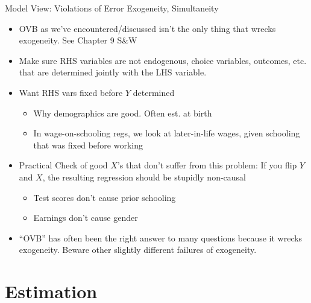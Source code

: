 \documentclass[aspectratio=169, handout]{beamer}
\begin{document}
{\footnotesize
\begin{frame}{Model View: Violations of Error Exogeneity, Simultaneity}
\begin{itemize}
  \item OVB as we've encountered/discussed isn't the \alert{only} thing
    that wrecks exogeneity.  See Chapter 9 S\&W
  \item Make sure RHS variables are not \alert{endogenous},
    \alert{choice variables}, \alert{outcomes}, etc.
    that are determined jointly with the LHS variable.
  \item Want RHS vars \alert{fixed} before $Y$ determined
    \begin{itemize}
      \item Why demographics are good.
        Often est. at birth
      \item In wage-on-schooling regs, we look at later-in-life
        wages, given schooling that was fixed before working
    \end{itemize}
  \item \alert{Practical Check} of good $X$'s that don't suffer from
    this problem:
    If you flip $Y$ and $X$, the resulting regression should be stupidly
    non-causal
    \begin{itemize}
      \item Test scores don't cause prior schooling
      \item Earnings don't cause gender
    \end{itemize}
  \item ``OVB'' has often been the right answer to many questions
    because it wrecks exogeneity.
    Beware other slightly different failures of exogeneity.
\end{itemize}
\end{frame}
}










\section{Estimation}
\end{document}
